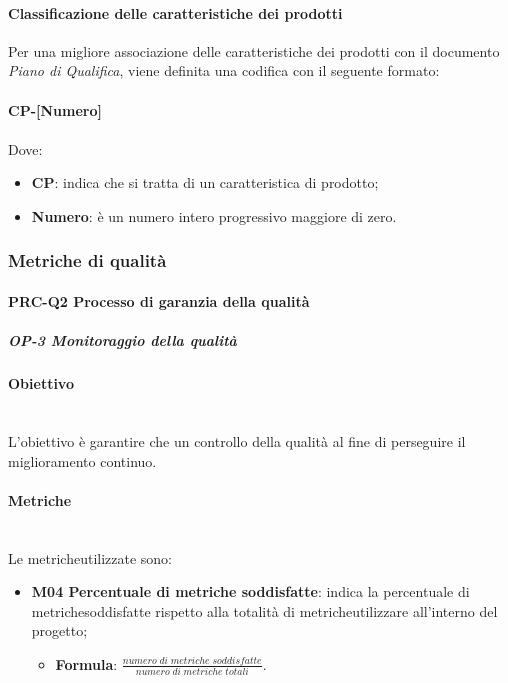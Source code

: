 \paragraph{Classificazione delle caratteristiche dei prodotti}
Per una migliore associazione delle caratteristiche dei prodotti con il documento \textit{Piano di Qualifica}, viene definita una codifica con il seguente formato: \\
\\ \textbf{CP-[Numero]} \\
\\ Dove:
\begin{itemize}
	\item \textbf{CP}: indica che si tratta di un caratteristica di prodotto;
	\item \textbf{Numero}: è un numero intero progressivo maggiore di zero.
\end{itemize}

\subsubsection{Metriche di qualità}
	\paragraph{PRC-Q2 Processo di garanzia della qualità}
	\subparagraph{OP-3 Monitoraggio della qualità}
		\paragraph*{Obiettivo}\mbox{}\\ [1mm]
		L'obiettivo è garantire che un controllo della qualità al fine di perseguire il miglioramento continuo.
		\paragraph*{Metriche}\mbox{}\\ [1mm]
		Le metriche\glosp utilizzate sono:
			\begin{itemize}
				\item \textbf{M04 Percentuale di metriche soddisfatte}: indica la percentuale di metriche\glosp soddisfatte rispetto alla totalità di metriche\glosp utilizzare all'interno del progetto\glo;
				\begin{itemize}
					\item[] \textbf{Formula}: $\frac{numero \; di \; metriche \; soddisfatte}{numero \; di \; metriche \; totali}$.
				\end{itemize}
			\end{itemize}
